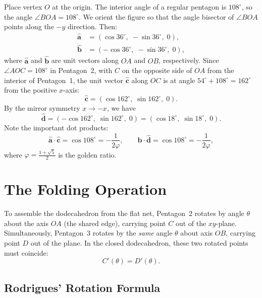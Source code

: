 \documentclass[11pt,a4paper]{article}
\newcommand{\uv}[1]{\hat{\mathbf{#1}}}
\theoremstyle{definition}
\begin{document}
Place vertex $O$ at the origin. The interior angle of a regular pentagon is
$108^\circ$, so the angle $\angle BOA = 108^\circ$. We orient the figure so that
the angle bisector of $\angle BOA$ points along the $-y$ direction. Then:
\begin{align}
  \uv{a} &= (\cos 36^\circ,\; -\sin 36^\circ,\; 0), \label{eq:ahat}\\
  \uv{b} &= (-\cos 36^\circ,\; -\sin 36^\circ,\; 0), \label{eq:bhat}
\end{align}
where $\uv{a}$ and $\uv{b}$ are unit vectors along $OA$ and $OB$, respectively.
Since $\angle AOC = 108^\circ$ in Pentagon~2, with $C$ on the opposite side of $OA$
from the interior of Pentagon~1, the unit vector $\uv{c}$ along $OC$ is at angle
$54^\circ + 108^\circ = 162^\circ$ from the positive $x$-axis:
\begin{equation}
  \uv{c} = (\cos 162^\circ,\; \sin 162^\circ,\; 0).
  \label{eq:chat}
\end{equation}
By the mirror symmetry $x \to -x$, we have
\begin{equation}
  \uv{d} = (-\cos 162^\circ,\; \sin 162^\circ,\; 0) = (\cos 18^\circ,\; \sin 18^\circ,\; 0).
  \label{eq:dhat}
\end{equation}
Note the important dot products:
\begin{equation}
  \uv{a} \cdot \uv{c} = \cos 108^\circ = -\frac{1}{2\varphi}, \qquad
  \uv{b} \cdot \uv{d} = \cos 108^\circ = -\frac{1}{2\varphi},
  \label{eq:dotprods}
\end{equation}
where $\varphi = \frac{1+\sqrt{5}}{2}$ is the golden ratio.

\section{The Folding Operation}

To assemble the dodecahedron from the flat net, Pentagon~2 rotates by angle
$\theta$ about the axis $OA$ (the shared edge), carrying point $C$ out of the
$xy$-plane. Simultaneously, Pentagon~3 rotates by the \emph{same} angle $\theta$
about axis $OB$, carrying point $D$ out of the plane. In the closed dodecahedron,
these two rotated points must coincide:
\[
  C'(\theta) = D'(\theta).
\]

\subsection{Rodrigues' Rotation Formula}
\end{document}
